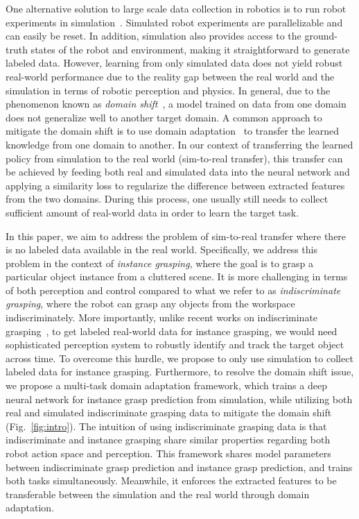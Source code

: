 \documentclass[letterpaper, 10 pt, conference]{ieeeconf}  %
\begin{document}
One alternative solution to large scale data collection in robotics is to run robot experiments in simulation~\cite{saxena2008robotic,rusu2016sim,tobin2017domain,james2017transferring,mahler2017dex,viereck2017learning}. Simulated robot experiments are parallelizable and can easily be reset. In addition, simulation also provides access to the ground-truth states of the robot and environment, making it straightforward to generate labeled data. However, learning from only simulated data does not yield robust real-world performance due to the reality gap between the real world and the simulation in terms of robotic perception and physics. In general, due to the phenomenon known as \textit{domain shift}~\cite{quinonero2008covariate}, a model trained on data from one domain does not generalize well to another target domain. A common approach to mitigate the domain shift is to use domain adaptation~\cite{pan2010survey} to transfer the learned knowledge from one domain to another. In our context of transferring the learned policy from simulation to the real world (sim-to-real transfer), this transfer can be achieved by feeding both real and simulated data into the neural network and applying a similarity loss to regularize the difference between extracted features from the two domains. During this process, one usually still needs to collect sufficient amount of real-world data in order to learn the target task.

In this paper, we aim to address the problem of sim-to-real transfer where there is no labeled data available in the real world. Specifically, we address this problem in the context of \textit{instance grasping}, where the goal is to grasp a particular object instance from a cluttered scene. It is more challenging in terms of both perception and control compared to what we refer to as \textit{indiscriminate grasping}, where the robot can grasp any objects from the workspace indiscriminately. More importantly, unlike recent works on indiscriminate grasping~\cite{levine2016learning,gupta}, to get labeled real-world data for instance grasping, we would need sophisticated perception system to robustly identify and track the target object across time. To overcome this hurdle, we propose to only use simulation to collect labeled data for instance grasping. Furthermore, to resolve the domain shift issue, we propose a multi-task domain adaptation framework, which trains a deep neural network for instance grasp prediction from simulation, while utilizing both real and simulated indiscriminate grasping data to mitigate the domain shift (Fig.~\ref{fig:intro}). The intuition of using indiscriminate grasping data is that indiscriminate and instance grasping share similar properties regarding both robot action space and perception. This framework shares model parameters between indiscriminate grasp prediction and instance grasp prediction, and trains both tasks simultaneously. Meanwhile, it enforces the extracted features to be transferable between the simulation and the real world through domain adaptation.
\end{document}

